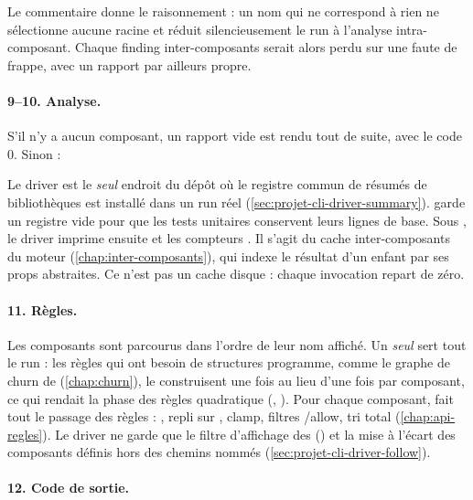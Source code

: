 
Le commentaire donne le raisonnement : un nom qui ne correspond à rien ne sélectionne aucune racine et réduit silencieusement le run à l'analyse intra-composant. Chaque finding inter-composants serait alors perdu sur une faute de frappe, avec un rapport par ailleurs propre.

\paragraph{9--10. Analyse.} S'il n'y a aucun composant, un rapport vide est rendu tout de suite, avec le code 0. Sinon :


Le driver est le \emph{seul} endroit du dépôt où le registre commun de résumés de bibliothèques est installé dans un run réel (\cref{sec:projet-cli-driver-summary}).  garde un registre vide pour que les tests unitaires conservent leurs lignes de base. Sous , le driver imprime ensuite  et les compteurs . Il s'agit du cache inter-composants du moteur (\cref{chap:inter-composants}), qui indexe le résultat d'un enfant par ses props abstraites. Ce n'est pas un cache disque : chaque invocation repart de zéro.

\paragraph{11. Règles.} Les composants sont parcourus dans l'ordre de leur nom affiché. Un \emph{seul}  sert tout le run : les règles qui ont besoin de structures programme, comme le graphe de churn de  (\cref{chap:churn}), le construisent une fois au lieu d'une fois par composant, ce qui rendait la phase des règles quadratique (, ). Pour chaque composant,  fait tout le passage des règles : , repli sur , clamp, filtres /allow, tri total (\cref{chap:api-regles}). Le driver ne garde que le filtre d'affichage des \Info{} () et la mise à l'écart des composants définis hors des chemins nommés (\cref{sec:projet-cli-driver-follow}).

\paragraph{12. Code de sortie.}

